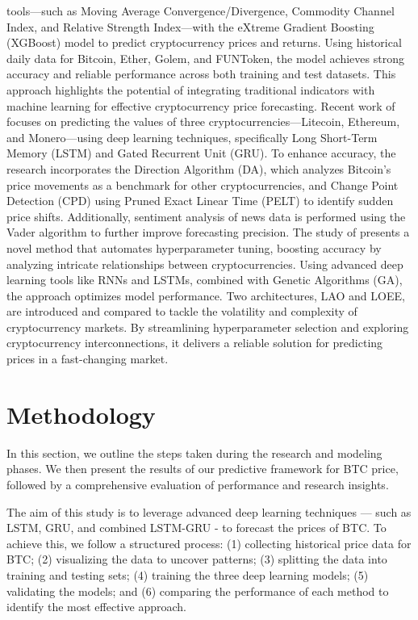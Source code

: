 \documentclass[]{interact}
\theoremstyle{plain}%
\theoremstyle{definition}
\theoremstyle{remark}
\begin{document}
tools---such as Moving Average Convergence/Divergence, Commodity Channel
Index, and Relative Strength Index---with the eXtreme Gradient Boosting
(XGBoost) model to predict cryptocurrency prices and returns. Using
historical daily data for Bitcoin, Ether, Golem, and FUNToken, the model
achieves strong accuracy and reliable performance across both training
and test datasets. This approach highlights the potential of integrating
traditional indicators with machine learning for effective
cryptocurrency price forecasting. Recent work of \citep{shirwaikar2025}
focuses on predicting the values of three cryptocurrencies---Litecoin,
Ethereum, and Monero---using deep learning techniques, specifically Long
Short-Term Memory (LSTM) and Gated Recurrent Unit (GRU). To enhance
accuracy, the research incorporates the Direction Algorithm (DA), which
analyzes Bitcoin's price movements as a benchmark for other
cryptocurrencies, and Change Point Detection (CPD) using Pruned Exact
Linear Time (PELT) to identify sudden price shifts. Additionally,
sentiment analysis of news data is performed using the Vader algorithm
to further improve forecasting precision. The study of
\citep{hafidi2025} presents a novel method that automates hyperparameter
tuning, boosting accuracy by analyzing intricate relationships between
cryptocurrencies. Using advanced deep learning tools like RNNs and
LSTMs, combined with Genetic Algorithms (GA), the approach optimizes
model performance. Two architectures, LAO and LOEE, are introduced and
compared to tackle the volatility and complexity of cryptocurrency
markets. By streamlining hyperparameter selection and exploring
cryptocurrency interconnections, it delivers a reliable solution for
predicting prices in a fast-changing market.

\section{Methodology}\label{methodology}

In this section, we outline the steps taken during the research and
modeling phases. We then present the results of our predictive framework
for BTC price, followed by a comprehensive evaluation of performance and
research insights.

The aim of this study is to leverage advanced deep learning techniques
--- such as LSTM, GRU, and combined LSTM-GRU - to forecast the prices of
BTC. To achieve this, we follow a structured process: (1) collecting
historical price data for BTC; (2) visualizing the data to uncover
patterns; (3) splitting the data into training and testing sets; (4)
training the three deep learning models; (5) validating the models; and
(6) comparing the performance of each method to identify the most
effective approach.
\end{document}
